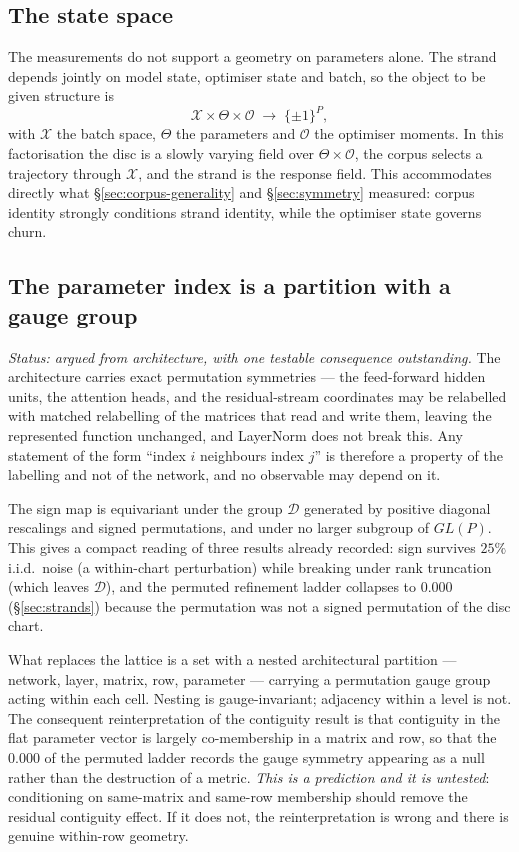 \subsection{The state space}
\label{sec:statespace}

The measurements do not support a geometry on parameters alone. The strand
depends jointly on model state, optimiser state and batch, so the object to be
given structure is
\[
\mathcal{X}\times\Theta\times\mathcal{O}
\;\longrightarrow\;\{\pm1\}^P ,
\]
with $\mathcal{X}$ the batch space, $\Theta$ the parameters and $\mathcal{O}$
the optimiser moments. In this factorisation the disc is a slowly varying field
over $\Theta\times\mathcal{O}$, the corpus selects a trajectory through
$\mathcal{X}$, and the strand is the response field. This accommodates directly
what \S\ref{sec:corpus-generality} and \S\ref{sec:symmetry} measured: corpus
identity strongly conditions strand identity, while the optimiser state governs
churn.

\subsection{The parameter index is a partition with a gauge group}
\label{sec:gauge}

\emph{Status: argued from architecture, with one testable consequence
outstanding.} The architecture carries exact permutation symmetries --- the
feed-forward hidden units, the attention heads, and the residual-stream
coordinates may be relabelled with matched relabelling of the matrices that
read and write them, leaving the represented function unchanged, and LayerNorm
does not break this. Any statement of the form ``index $i$ neighbours index
$j$'' is therefore a property of the labelling and not of the network, and no
observable may depend on it.

The sign map is equivariant under the group $\mathcal{D}$ generated by positive
diagonal rescalings and signed permutations, and under no larger subgroup of
$GL(P)$. This gives a compact reading of three results already recorded: sign
survives $25\%$ i.i.d.\ noise (a within-chart perturbation) while breaking under
rank truncation (which leaves $\mathcal{D}$), and the permuted refinement
ladder collapses to $0.000$ (\S\ref{sec:strands}) because the permutation was
not a signed permutation of the disc chart.

What replaces the lattice is a set with a nested architectural partition ---
network, layer, matrix, row, parameter --- carrying a permutation gauge group
acting within each cell. Nesting is gauge-invariant; adjacency within a level is
not. The consequent reinterpretation of the contiguity result is that
contiguity in the flat parameter vector is largely co-membership in a matrix
and row, so that the $0.000$ of the permuted ladder records the gauge symmetry
appearing as a null rather than the destruction of a metric. \emph{This is a
prediction and it is untested}: conditioning on same-matrix and same-row
membership should remove the residual contiguity effect. If it does not, the
reinterpretation is wrong and there is genuine within-row geometry.

